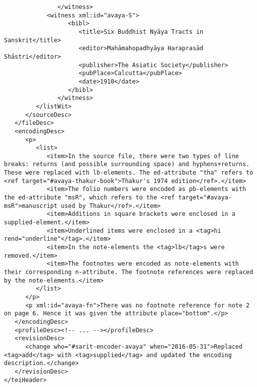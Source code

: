 \documentclass[article,12pt,a4paper]{memoir}%
\begin{document}
\begin{verbatim}
	           </witness>
            <witness xml:id="avaya-S">
	              <bibl>
	                 <title>Six Buddhist Nyāya Tracts in Sanskrit</title>
	                 <editor>Mahāmahopadhyāya Haraprasād Shāstri</editor>
	                 <publisher>The Asiatic Society</publisher>
	                 <pubPlace>Calcutta</pubPlace>
	                 <date>1910</date>
	              </bibl>
	           </witness>
         </listWit>
      </sourceDesc>
   </fileDesc>
   <encodingDesc>
      <p>
         <list>
            <item>In the source file, there were two types of line breaks: returns (and possible surrounding space) and hyphens+returns. These were replaced with lb-elements. The ed-attribute "tha" refers to <ref target="#avaya-thakur-book">Thakur's 1974 edition</ref>.</item>
            <item>The folio numbers were encoded as pb-elements with the ed-attribute "msR", which refers to the <ref target="#avaya-msR">manuscript used by Thakur</ref>.</item>
            <item>Additions in square brackets were enclosed in a supplied-element.</item>
            <item>Underlined items were enclosed in a <tag>hi rend="underline"</tag>.</item>
            <item>In the note-elements the <tag>lb</tag>s were removed.</item>
            <item>The footnotes were encoded as note-elements with their corresponding n-attribute. The footnote references were replaced by the note-elements.</item>
         </list>
      </p>
      <p xml:id="avaya-fn">There was no footnote reference for note 2 on page 6. Hence it was given the attribute place="bottom".</p>
   </encodingDesc>
   <profileDesc><!-- ... --></profileDesc>
   <revisionDesc>
      <change who="#sarit-encoder-avaya" when="2016-05-31">Replaced <tag>add</tag> with <tag>supplied</tag> and updated the encoding description.</change>
   </revisionDesc>
</teiHeader>
	 \end{verbatim}
       
      \clearpage
      \begin{english}
      \printshorthands
      \printbibliography
      \end{english}
    
\end{document}
